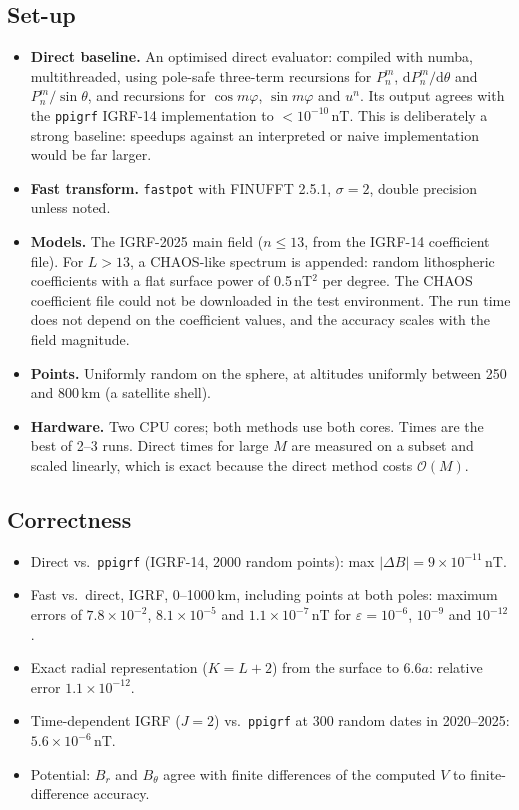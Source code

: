 \documentclass[11pt,a4paper]{article}
\theoremstyle{remark}
\newcommand{\eps}{\varepsilon}
\newcommand{\Oh}{\mathcal{O}}
\begin{document}
\subsection{Set-up}
\begin{itemize}
\item \textbf{Direct baseline.} An optimised direct evaluator: compiled with numba, multithreaded,
  using pole-safe three-term recursions for $P_n^m$, $\mathrm dP_n^m/\mathrm d\theta$ and
  $P_n^m/\sin\theta$, and recursions for $\cos m\varphi$, $\sin m\varphi$ and $u^n$. Its output agrees with the
  \texttt{ppigrf} IGRF-14 implementation to $<10^{-10}$\,nT. This is deliberately a strong
  baseline: speedups against an interpreted or naive implementation would be far larger.
\item \textbf{Fast transform.} \texttt{fastpot} with FINUFFT 2.5.1, $\sigma=2$, double precision unless noted.
\item \textbf{Models.} The IGRF-2025 main field ($n\le13$, from the IGRF-14 coefficient file). For $L>13$, a
  CHAOS-like spectrum is appended: random lithospheric coefficients with a flat surface power of 0.5\,nT$^2$
  per degree. The CHAOS coefficient file could not be downloaded in the test environment. The run time does
  not depend on the coefficient values, and the accuracy scales with the field magnitude.
\item \textbf{Points.} Uniformly random on the sphere, at altitudes uniformly between 250 and 800\,km
  (a satellite shell).
\item \textbf{Hardware.} Two CPU cores; both methods use both cores. Times are the best of 2--3 runs.
  Direct times for large $M$ are measured on a subset and scaled linearly, which is exact because the
  direct method costs $\Oh(M)$.
\end{itemize}

\subsection{Correctness}
\begin{itemize}
\item Direct vs.\ \texttt{ppigrf} (IGRF-14, 2000 random points): max $|\Delta B|=9\times10^{-11}$\,nT.
\item Fast vs.\ direct, IGRF, 0--1000\,km, including points at both poles: maximum errors of
  $7.8\times10^{-2}$, $8.1\times10^{-5}$ and $1.1\times10^{-7}$\,nT for $\eps=10^{-6}$, $10^{-9}$ and $10^{-12}$.
\item Exact radial representation ($K=L+2$) from the surface to $6.6a$: relative error $1.1\times10^{-12}$.
\item Time-dependent IGRF ($J=2$) vs.\ \texttt{ppigrf} at 300 random dates in 2020--2025: $5.6\times10^{-6}$\,nT.
\item Potential: $B_r$ and $B_\theta$ agree with finite differences of the computed $V$ to finite-difference accuracy.
\end{itemize}
\end{document}
